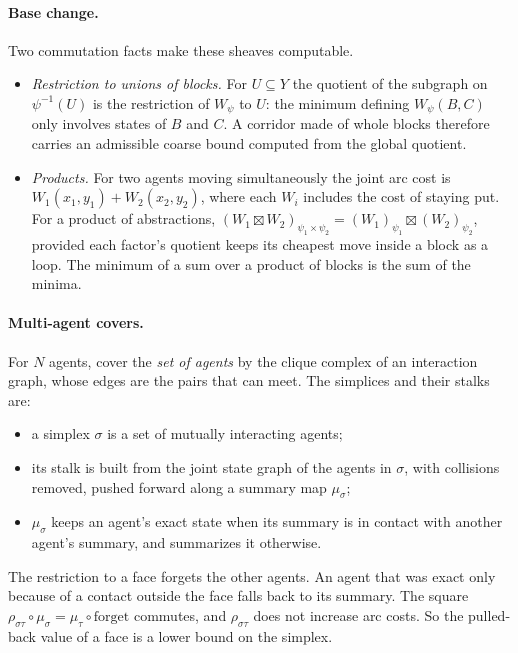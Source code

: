 \documentclass[11pt]{article}
\theoremstyle{definition}
\theoremstyle{remark}
\begin{document}
\paragraph{Base change.}
Two commutation facts make these sheaves computable.
\begin{itemize}
\item \emph{Restriction to unions of blocks.} For $U \subseteq Y$ the quotient of
  the subgraph on $\psi^{-1}(U)$ is the restriction of $W_\psi$ to $U$: the minimum
  defining $W_\psi(B,C)$ only involves states of $B$ and $C$. A corridor made of
  whole blocks therefore carries an admissible coarse bound computed from the
  global quotient.
\item \emph{Products.} For two agents moving simultaneously the joint arc cost is
  $W_1(x_1,y_1) + W_2(x_2,y_2)$, where each $W_i$ includes the cost of staying
  put. For a product of abstractions,
  $(W_1 \boxtimes W_2)_{\psi_1 \times \psi_2} = (W_1)_{\psi_1} \boxtimes (W_2)_{\psi_2}$,
  provided each factor's quotient keeps its cheapest move inside a block as a loop.
  The minimum of a sum over a product of blocks is the sum of the minima.
\end{itemize}

\paragraph{Multi-agent covers.}
For $N$ agents, cover the \emph{set of agents} by the clique complex of an
interaction graph, whose edges are the pairs that can meet. The simplices and
their stalks are:
\begin{itemize}[nosep]
\item a simplex $\sigma$ is a set of mutually interacting agents;
\item its stalk is built from the joint state graph of the agents in $\sigma$,
  with collisions removed, pushed forward along a summary map $\mu_\sigma$;
\item $\mu_\sigma$ keeps an agent's exact state when its summary is in contact
  with another agent's summary, and summarizes it otherwise.
\end{itemize}
The restriction to a face forgets the other agents. An agent that was exact only
because of a contact outside the face falls back to its summary. The square
$\rho_{\sigma\tau} \circ \mu_\sigma = \mu_\tau \circ \mathrm{forget}$ commutes, and
$\rho_{\sigma\tau}$ does not increase arc costs. So the pulled-back value of a face
is a lower bound on the simplex.
\end{document}
